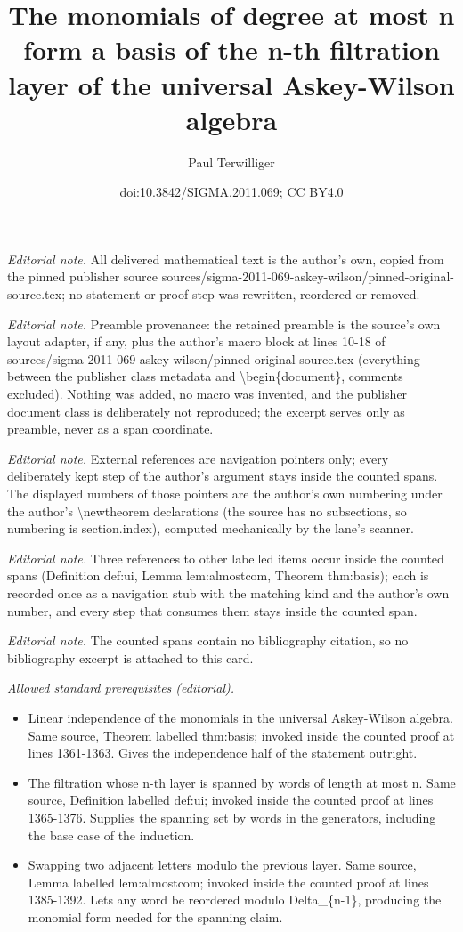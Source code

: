 \documentclass[10pt,a4paper]{amsart}
\title{The monomials of degree at most n form a basis of the n-th filtration layer of the universal Askey-Wilson algebra}
\author{Paul Terwilliger}
\date{doi:10.3842/SIGMA.2011.069; CC BY4.0}
\begin{document}
\maketitle
\noindent\textit{Editorial note.} All delivered mathematical text is the author's own, copied from the pinned publisher source sources/sigma-2011-069-askey-wilson/pinned-original-source.tex; no statement or proof step was rewritten, reordered or removed.\par\medskip
\noindent\textit{Editorial note.} Preamble provenance: the retained preamble is the source's own layout adapter, if any, plus the author's macro block at lines 10-18 of sources/sigma-2011-069-askey-wilson/pinned-original-source.tex (everything between the publisher class metadata and \textbackslash{}begin\{document\}, comments excluded). Nothing was added, no macro was invented, and the publisher document class is deliberately not reproduced; the excerpt serves only as preamble, never as a span coordinate.\par\medskip
\noindent\textit{Editorial note.} External references are navigation pointers only; every deliberately kept step of the author's argument stays inside the counted spans. The displayed numbers of those pointers are the author's own numbering under the author's \textbackslash{}newtheorem declarations (the source has no subsections, so numbering is section.index), computed mechanically by the lane's scanner.\par\medskip
\noindent\textit{Editorial note.} Three references to other labelled items occur inside the counted spans (Definition def:ui, Lemma lem:almostcom, Theorem thm:basis); each is recorded once as a navigation stub with the matching kind and the author's own number, and every step that consumes them stays inside the counted span.\par\medskip
\noindent\textit{Editorial note.} The counted spans contain no bibliography citation, so no bibliography excerpt is attached to this card.\par\medskip
\noindent\textit{Allowed standard prerequisites (editorial).}\begin{itemize}
\item Linear independence of the monomials in the universal Askey-Wilson algebra. Same source, Theorem labelled thm:basis; invoked inside the counted proof at lines 1361-1363. Gives the independence half of the statement outright.
\item The filtration whose n-th layer is spanned by words of length at most n. Same source, Definition labelled def:ui; invoked inside the counted proof at lines 1365-1376. Supplies the spanning set by words in the generators, including the base case of the induction.
\item Swapping two adjacent letters modulo the previous layer. Same source, Lemma labelled lem:almostcom; invoked inside the counted proof at lines 1385-1392. Lets any word be reordered modulo Delta\_\{n-1\}, producing the monomial form needed for the spanning claim.
\end{itemize}\medskip
\end{document}
